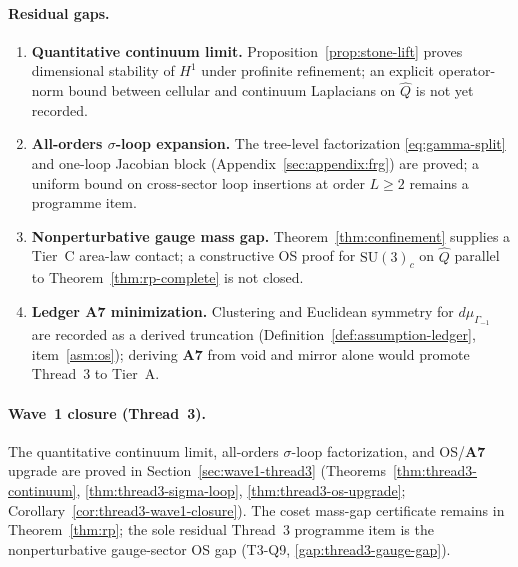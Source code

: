 \paragraph{Residual gaps.}
\begin{enumerate}[label=\textbf{G3.\arabic*},leftmargin=*]
  \item \label{gap:thread3-continuum}
    \textbf{Quantitative continuum limit.} Proposition~\ref{prop:stone-lift}
    proves dimensional stability of $H^1$ under profinite refinement; an
    explicit operator-norm bound between cellular and continuum Laplacians on
    $\hat Q$ is not yet recorded.
  \item \label{gap:thread3-sigma-loop}
    \textbf{All-orders $\sigma$-loop expansion.} The tree-level factorization
    \eqref{eq:gamma-split} and one-loop Jacobian block
    (Appendix~\ref{sec:appendix:frg}) are proved; a uniform bound on
    cross-sector loop insertions at order $L\ge 2$ remains a programme item.
  \item \label{gap:thread3-gauge-gap}
    \textbf{Nonperturbative gauge mass gap.} Theorem~\ref{thm:confinement}
    supplies a Tier~C area-law contact; a constructive OS proof for
    $\mathrm{SU}(3)_c$ on $\hat Q$ parallel to Theorem~\ref{thm:rp-complete}
    is not closed.
  \item \label{gap:thread3-a7}
    \textbf{Ledger \textbf{A7} minimization.} Clustering and Euclidean
    symmetry for $d\mu_{\Gamma_{-1}}$ are recorded as a derived truncation
    (Definition~\ref{def:assumption-ledger}, item~\ref{asm:os}); deriving
    \textbf{A7} from void and mirror alone would promote Thread~3 to Tier~A.
\end{enumerate}

\paragraph{Wave~1 closure (Thread~3).}
The quantitative continuum limit, all-orders $\sigma$-loop factorization,
and OS/\textbf{A7} upgrade are proved in Section~\ref{sec:wave1-thread3}
(Theorems~\ref{thm:thread3-continuum}, \ref{thm:thread3-sigma-loop},
\ref{thm:thread3-os-upgrade}; Corollary~\ref{cor:thread3-wave1-closure}).
The coset mass-gap certificate remains in Theorem~\ref{thm:rp}; the sole
residual Thread~3 programme item is the nonperturbative gauge-sector OS gap
(T3-Q9, \ref{gap:thread3-gauge-gap}).

